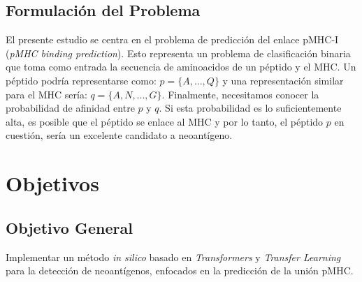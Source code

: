 \subsection{Formulación del Problema}

El presente estudio se centra en el problema de predicción del enlace pMHC-I (\textit{pMHC binding prediction}). Esto representa un problema de clasificación binaria que toma como entrada la secuencia de aminoacidos de un péptido y el MHC. Un péptido podría representarse como: $p = \{A, ..., Q\}$ y una representación similar para el MHC sería: $q = \{A, N, ..., G\}$. Finalmente, necesitamos conocer la probabilidad de afinidad entre $p$ y $q$. Si esta probabilidad es lo suficientemente alta, es posible que el péptido se enlace al MHC y por lo tanto, el péptido $p$ en cuestión, sería un excelente candidato a neoantígeno.





\section{Objetivos}
\label{sec:objetivos}

\subsection{Objetivo General}


Implementar un método \textit{in silico} basado en \textit{Transformers} y \textit{Transfer Learning} para la detección de neoantígenos, enfocados en la predicción de la unión pMHC. 

